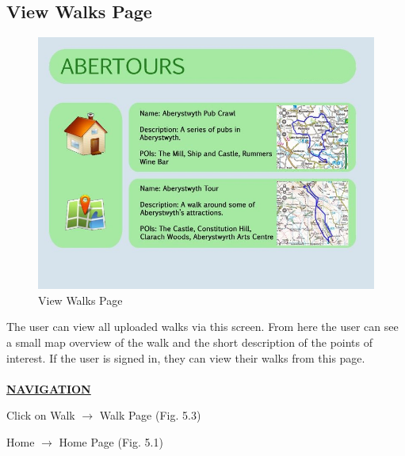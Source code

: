 \documentclass[12pt]{article}
\begin{document}
{\subsection{View Walks Page}
\begin{figure}[htp]
\centering
\includegraphics[scale=0.60]{Project_Plan/Web/Your_Tours_Page_01.jpg}
\caption{View Walks Page}
\label{View Walks Page}
\end{figure}
\par{The user can view all uploaded walks via this screen. From here the user can see a small map overview of the walk and the short description of the points of interest. If the user is signed in, they can view their walks from this page. \\ \\}
\textbf{\uline{NAVIGATION}}
\par{Click on Walk $\rightarrow$ Walk Page (Fig. 5.3)}
\par{Home $\rightarrow$ Home Page (Fig. 5.1)}
\clearpage
}
\end{document}
